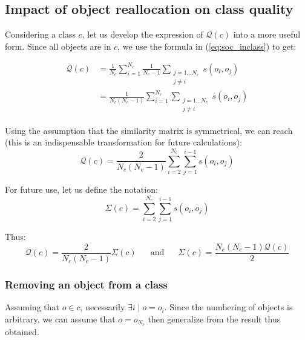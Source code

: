 \documentclass[a4paper,twoside]{article}
\begin{document}
\subsection{Impact of object reallocation on class quality}

Considering a class $c$, let us develop the expression of $\mathcal{Q}(c)$ into a more useful form. Since all objects are in $c$, we use the formula in (\ref{eq:soc_inclass}) to get:

\begin{equation}
  \begin{aligned}
    \mathcal{Q}\left(c\right) & = \frac{1}{N_c} \sum_{i=1}^{N_c} \frac{1}{N_c-1} \sum_{\substack{j=1 \ldots N_c\\j \neq i}} s\left(o_i, o_j\right) \\
                              & = \frac{1}{N_c(N_c-1)} \sum_{i=1}^{N_c} \sum_{\substack{j=1 \ldots N_c\\j \neq i}} s\left(o_i, o_j\right)
  \end{aligned}
\end{equation}

Using the assumption that the similarity matrix is symmetrical, we can reach (this is an indispensable transformation for future calculations):
\begin{equation}
    \mathcal{Q}\left(c\right) = \frac{2}{N_c(N_c-1)} \sum_{i=2}^{N_c} \sum_{j=1}^{i-1} s\left(o_i, o_j\right)
    \label{eq:classQuality}
\end{equation}

For future use, let us define the notation:
\begin{equation}
  \Sigma(c) = \sum_{i=2}^{N_c} \sum_{j=1}^{i-1} s\left(o_i, o_j\right)
\end{equation}

Thus:
\begin{equation}
    \mathcal{Q}\left(c\right) = \frac{2}{N_c(N_c-1)}\Sigma(c) \phantom{XX}\mathrm{and}\phantom{XX} \Sigma(c) = \frac{N_c(N_c-1)\mathcal{Q}\left(c\right)}{2}
\end{equation}


\subsubsection{Removing an object from a class}

Assuming that $o \in c$, necessarily $\exists i \mid o=o_i$. Since the
numbering of objects is arbitrary, we can assume that $o = o_{N_c}$
then generalize from the result thus obtained.
\end{document}
